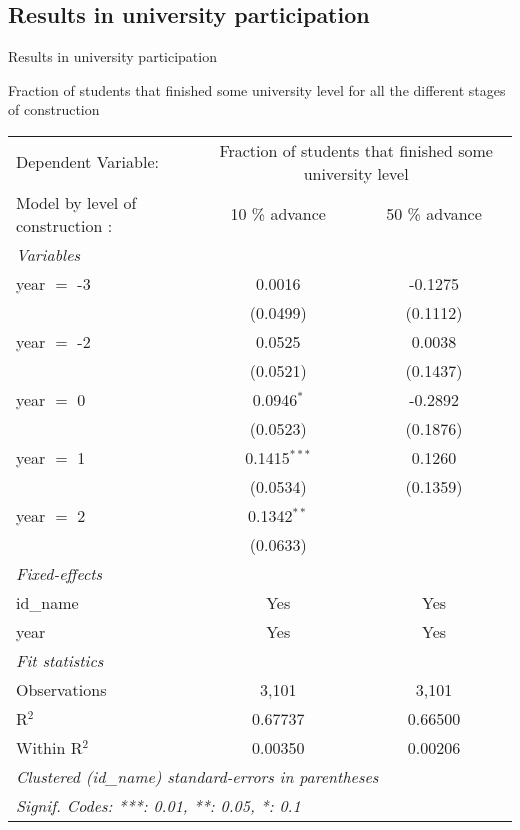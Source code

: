 \documentclass[9pt]{beamer}
\begin{document}
\subsection{Results in university participation}
\begin{frame}{Results in university participation}
     
 \begin{center} \label{tab:B.4} 
 
Fraction of students that finished some university level for all the different stages of construction

 \tiny
     \begin{tabular}{lcc}
   \tabularnewline \midrule \midrule
   Dependent Variable: & \multicolumn{2}{c}{Fraction of students that finished some university level}\\
    Model by level of construction   :       & 10 \% advance          & 50 \% advance \\  
   \midrule
   \emph{Variables}\\
   year $=$ -3  & 0.0016         & -0.1275\\   
                & (0.0499)       & (0.1112)\\   
   year $=$ -2  & 0.0525         & 0.0038\\   
                & (0.0521)       & (0.1437)\\   
   year $=$ 0   & 0.0946$^{*}$   & -0.2892\\   
                & (0.0523)       & (0.1876)\\   
   year $=$ 1   & 0.1415$^{***}$ & 0.1260\\   
                & (0.0534)       & (0.1359)\\   
   year $=$ 2   & 0.1342$^{**}$  &   \\   
                & (0.0633)       &   \\   
   \midrule
   \emph{Fixed-effects}\\
   id\_name     & Yes            & Yes\\  
   year         & Yes            & Yes\\  
   \midrule
   \emph{Fit statistics}\\
   Observations & 3,101          & 3,101\\  
   R$^2$        & 0.67737        & 0.66500\\  
   Within R$^2$ & 0.00350        & 0.00206\\  
   \midrule \midrule
   \multicolumn{3}{l}{\emph{Clustered (id\_name) standard-errors in parentheses}}\\
   \multicolumn{3}{l}{\emph{Signif. Codes: ***: 0.01, **: 0.05, *: 0.1}}\\
   \midrule
\end{tabular}
 \end{center}
 
\end{frame}
\end{document}
